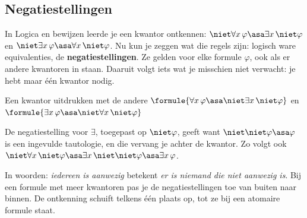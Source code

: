 \subsection{Negatiestellingen}

In Logica en bewijzen leerde je een kwantor ontkennen: $\niet\forall x\, \varphi \asa \exists x\, \niet\varphi$ en $\niet\exists x\, \varphi \asa \forall x\, \niet\varphi$. Nu kun je zeggen wat die regels zijn: logisch ware equivalenties, de \textbf{negatiestellingen}. Ze gelden voor elke formule $\varphi$, ook als er andere kwantoren in staan. Daaruit volgt iets wat je misschien niet verwacht: je hebt maar één kwantor nodig.

\begin{theorie}
\begin{stelling}{Een kwantor uitdrukken met de andere}
\qquad $\formule{\forall x\, \varphi \asa \niet\exists x\, \niet\varphi}$ \qquad en \qquad $\formule{\exists x\, \varphi \asa \niet\forall x\, \niet\varphi}$
\end{stelling}

\begin{bewijs}
De negatiestelling voor $\exists$, toegepast op $\niet\varphi$, geeft
want $\niet\niet\varphi \asa \varphi$ is een ingevulde tautologie, en die vervang je achter de kwantor. Zo volgt ook $\niet\forall x\, \niet\varphi \asa \exists x\, \niet\niet\varphi \asa \exists x\, \varphi$.
\end{bewijs}
\end{theorie}

In woorden: \textit{iedereen is aanwezig} betekent \textit{er is niemand die niet aanwezig is}. Bij een formule met meer kwantoren pas je de negatiestellingen toe van buiten naar binnen. De ontkenning schuift telkens één plaats op, tot ze bij een atomaire formule staat.


